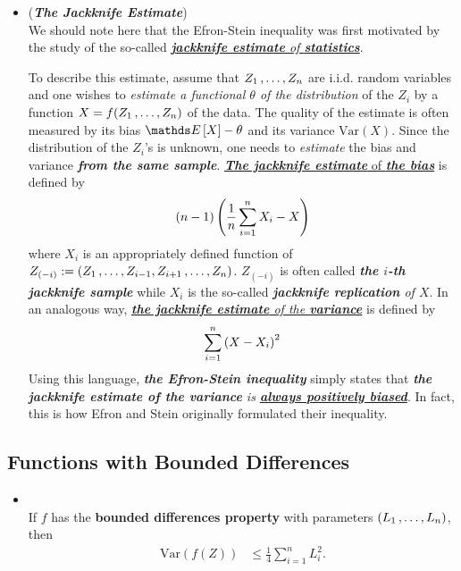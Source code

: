 \documentclass[11pt]{article}
\begin{document}
\begin{itemize}
\item \begin{example} (\textbf{\emph{The Jackknife Estimate}}) \\
We should note here that the Efron-Stein inequality was first motivated by the study of the so-called \underline{\emph{\textbf{jackknife estimate} of \textbf{statistics}}}. 

To describe this estimate, assume that $Z_1 \,{,}\ldots{,}\, Z_n$ are i.i.d. random variables and one wishes to\emph{ estimate a functional $\theta$ of the distribution} of the $Z_i$ by a function $X = f(Z_1 \,{,}\ldots{,}\, Z_n)$ of the data. The quality of the estimate is often measured by its bias $\E{}{X} - \theta$ and its variance $\text{Var}(X)$. Since the distribution of the $Z_i$'s is unknown, one needs to \emph{estimate} the bias and variance \emph{\textbf{from the same sample}}. \underline{\emph{\textbf{The jackknife estimate}} of \emph{\textbf{the bias}}} is defined by
\begin{align}
(n-1)\left(\frac{1}{n}\sum_{i=1}^{n}X_i - X\right) \label{eqn: jackknive_estimate_bias}
\end{align} where $X_i$ is an appropriately defined function of $Z_{(-i)} := (Z_1 \,{,}\ldots{,}\, Z_{i-1}, Z_{i+1} \,{,}\ldots{,}\, Z_n)$. $Z_{(-i)}$ is often called \emph{\textbf{the $i$-th jackknife sample}} while $X_i$ is the so-called \emph{\textbf{jackknife replication} of $X$}. In an analogous way, \underline{\emph{\textbf{the jackknife estimate} of the \textbf{variance}}} is defined by
\begin{align}
\sum_{i=1}^{n}\left(X - X_i\right)^2 \label{eqn: jackknive_estimate_bias}
\end{align}
Using this language, \emph{\textbf{the Efron-Stein inequality}} simply states that \emph{\textbf{the jackknife estimate of the variance} is \underline{\textbf{always positively biased}}}. In fact, this is how Efron and Stein originally formulated their inequality.
\end{example}
\end{itemize}
\subsection{Functions with Bounded Differences}
\begin{itemize}
\item \begin{corollary} \citep{boucheron2013concentration}\\
If $f$ has the \textbf{bounded differences property} with parameters $(L_1 \,{,}\ldots{,}\, L_n)$, then
\begin{align*}
\text{Var}(f(Z)) &\le \frac{1}{4}\sum_{i=1}^{n}L_i^2.
\end{align*}
\end{corollary}
\end{itemize}
\end{document}

